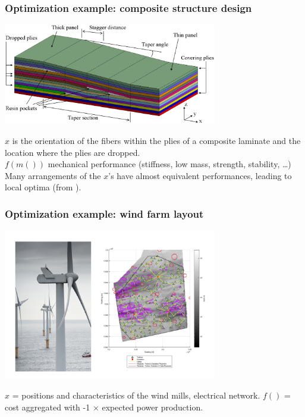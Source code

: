 \documentclass[12pt]{beamer}
\begin{document}
\begin{frame}
\frametitle{Optimization example: composite structure design}
\begin{center}
\includegraphics[width=0.7\textwidth]{ply_drop.png}
\end{center}
$x$ is the orientation of the fibers within the plies of a composite laminate and the location where the plies are dropped.
\\
$f(m())$ mechanical performance (stiffness, low mass, strength, stability, \ldots)
\\
Many arrangements of the $x$'s have almost equivalent performances, leading to local optima
(from \cite{irisarri2014optimal}).
\end{frame}

\begin{frame}
\frametitle{Optimization example: wind farm layout}
\begin{center}
\includegraphics[width=0.7\textwidth]{wind_farm_model.pdf}
\end{center}
$x$ = positions and characteristics of the wind mills, electrical network.
$f()$ = cost aggregated with -1 $\times$ expected power production.
\end{frame}
\end{document}
